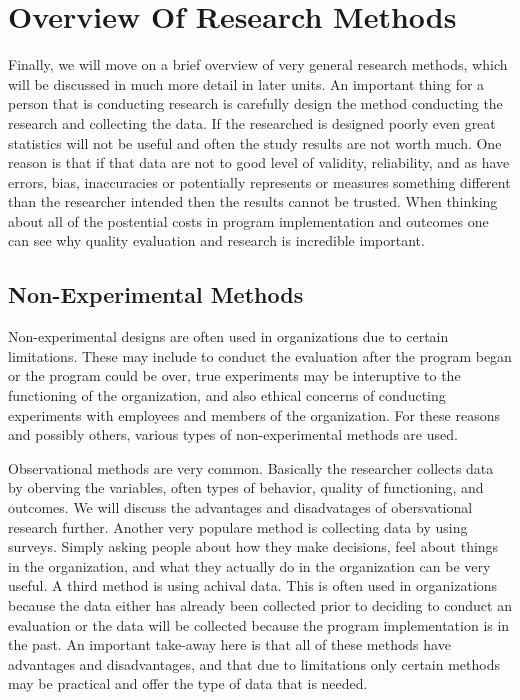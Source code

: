 \documentclass[]{book}
\theoremstyle{definition}
\theoremstyle{definition}
\theoremstyle{definition}
\theoremstyle{remark}
\begin{document}
\hypertarget{overview-of-research-methods}{%
\section{Overview Of Research
Methods}\label{overview-of-research-methods}}

Finally, we will move on a brief overview of very general research
methods, which will be discussed in much more detail in later units. An
important thing for a person that is conducting research is carefully
design the method conducting the research and collecting the data. If
the researched is designed poorly even great statistics will not be
useful and often the study results are not worth much. One reason is
that if that data are not to good level of validity, reliability, and as
have errors, bias, inaccuracies or potentially represents or measures
something different than the researcher intended then the results cannot
be trusted. When thinking about all of the postential costs in program
implementation and outcomes one can see why quality evaluation and
research is incredible important.

\hypertarget{non-experimental-methods}{%
\subsection{Non-Experimental Methods}\label{non-experimental-methods}}

Non-experimental designs are often used in organizations due to certain
limitations. These may include to conduct the evaluation after the
program began or the program could be over, true experiments may be
interuptive to the functioning of the organization, and also ethical
concerns of conducting experiments with employees and members of the
organization. For these reasons and possibly others, various types of
non-experimental methods are used.

Observational methods are very common. Basically the researcher collects
data by oberving the variables, often types of behavior, quality of
functioning, and outcomes. We will discuss the advantages and
disadvatages of obersvational research further. Another very populare
method is collecting data by using surveys. Simply asking people about
how they make decisions, feel about things in the organization, and what
they actually do in the organization can be very useful. A third method
is using achival data. This is often used in organizations because the
data either has already been collected prior to deciding to conduct an
evaluation or the data will be collected because the program
implementation is in the past. An important take-away here is that all
of these methods have advantages and disadvantages, and that due to
limitations only certain methods may be practical and offer the type of
data that is needed.
\end{document}
